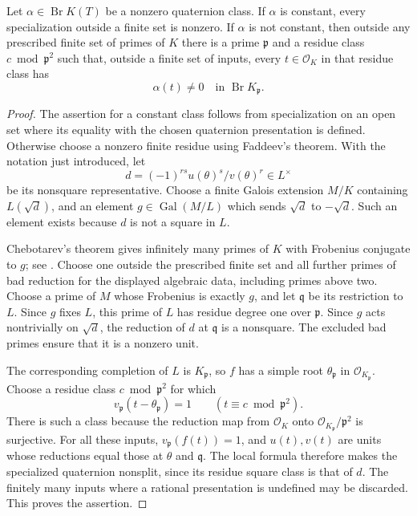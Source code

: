\begin{lemma}\label{p2lb:brauer-progression}
Let $\alpha\in\operatorname{Br}K(T)$ be a nonzero quaternion class.
If $\alpha$ is constant, every specialization outside a finite set
is nonzero.  If $\alpha$ is not constant, then outside any prescribed
finite set of primes of $K$ there is a prime $\mathfrak p$ and a
residue class $c\bmod\mathfrak p^2$ such that, outside a finite set
of inputs, every $t\in\mathcal O_K$ in that residue class has
\[
                   \alpha(t)\ne0\quad\text{in }
                   \operatorname{Br}K_{\mathfrak p}.
\]
\end{lemma}
\begin{proof}
The assertion for a constant class follows from specialization on an
open set where its equality with the chosen quaternion presentation is
defined.  Otherwise choose a nonzero finite residue using Faddeev's
theorem.  With the notation just introduced, let
\[
 d=(-1)^{rs}u(\theta)^s/v(\theta)^r\in L^\times
\]
be its nonsquare representative.  Choose a finite Galois extension
$M/K$ containing $L(\sqrt d)$, and an element
$g\in\operatorname{Gal}(M/L)$ which sends $\sqrt d$ to $-\sqrt d$.
Such an element exists because $d$ is not a square in $L$.

Chebotarev's theorem gives infinitely many primes of $K$ with Frobenius
conjugate to $g$; see \cite[Section~2.1, Theorem~1]{p2lbSerre1981}.
Choose one outside the prescribed finite set and all further primes of
bad reduction for the displayed algebraic data, including primes above
two.  Choose a prime of $M$ whose Frobenius is exactly $g$, and let
$\mathfrak q$ be its restriction to $L$.  Since $g$ fixes $L$, this
prime of $L$ has residue degree one over $\mathfrak p$.  Since $g$
acts nontrivially on $\sqrt d$, the reduction of $d$ at
$\mathfrak q$ is a nonsquare.  The excluded bad primes ensure that
it is a nonzero unit.

The corresponding completion of $L$ is $K_{\mathfrak p}$, so
$f$ has a simple root $\theta_{\mathfrak p}$ in
$\mathcal O_{K_{\mathfrak p}}$.  Choose a residue class
$c\bmod\mathfrak p^2$ for which
\[
 v_{\mathfrak p}(t-\theta_{\mathfrak p})=1
 \qquad(t\equiv c\bmod\mathfrak p^2).
\]
There is such a class because the reduction map from $\mathcal O_K$
onto $\mathcal O_{K_{\mathfrak p}}/\mathfrak p^2$ is surjective.
For all these inputs, $v_{\mathfrak p}(f(t))=1$, and $u(t),v(t)$
are units whose reductions equal those at $\theta$ and
$\mathfrak q$.  The local formula therefore makes the specialized
quaternion nonsplit, since its residue square class is that of $d$.
The finitely many inputs where a rational presentation is undefined may
be discarded.  This proves the assertion.
\end{proof}

